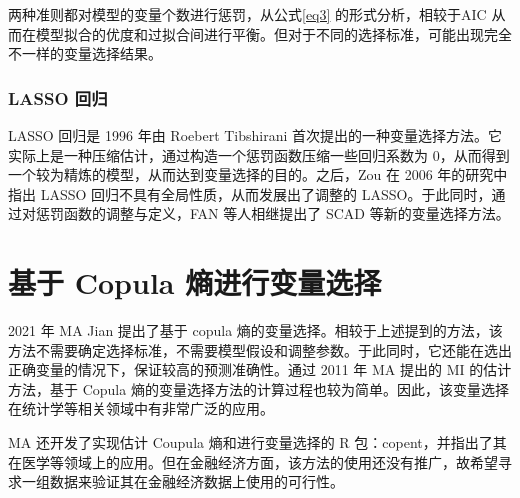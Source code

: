 \documentclass[a4paper]{ctexart}
\begin{document}
两种准则都对模型的变量个数进行惩罚，从公式\ref{eq3} 的形式分析，相较于AIC 从而在模型拟合的优度和过拟合间进行平衡。但对于不同的选择标准，可能出现完全不一样的变量选择结果。

\subsubsection*{LASSO 回归}
LASSO 回归是 1996 年由 Roebert Tibshirani\cite{ref16} 首次提出的一种变量选择方法。它实际上是一种压缩估计，通过构造一个惩罚函数压缩一些回归系数为 0，从而得到一个较为精炼的模型，从而达到变量选择的目的。之后，Zou\cite{ref17} 在 2006 年的研究中指出 LASSO 回归不具有全局性质，从而发展出了调整的 LASSO。于此同时，通过对惩罚函数的调整与定义，FAN\cite{ref18} 等人相继提出了 SCAD 等新的变量选择方法。


\section{基于 Copula 熵进行变量选择}
2021 年 MA Jian\cite{ref19} 提出了基于 copula 熵的变量选择。相较于上述提到的方法，该方法不需要确定选择标准，不需要模型假设和调整参数。于此同时，它还能在选出正确变量的情况下，保证较高的预测准确性。通过 2011 年 MA\cite{ref6} 提出的 MI 的估计方法，基于 Copula 熵的变量选择方法的计算过程也较为简单。因此，该变量选择在统计学等相关领域中有非常广泛的应用。

MA\cite{ref20} 还开发了实现估计 Coupula 熵和进行变量选择的 R 包：copent，并指出了其在医学等领域上的应用。但在金融经济方面，该方法的使用还没有推广，故希望寻求一组数据来验证其在金融经济数据上使用的可行性。
\end{document}
